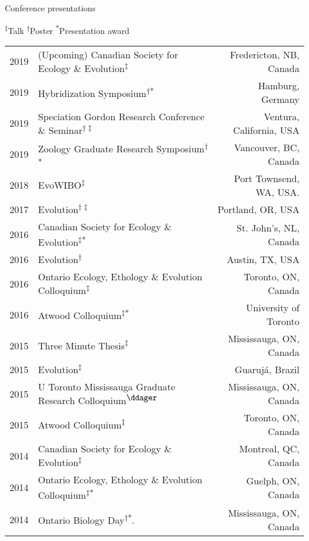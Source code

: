 \documentclass[11pt]{article}
\begin{document}
\vspace{0.5em}


\noindent
\begin{rSection}{Conference presentations} %


\textsuperscript{$\ddagger$}Talk
\textsuperscript{$\dag$}Poster
\textsuperscript{*}Presentation award

\vspace{0.5em}
\noindent
\begin{tabular}{llr}

2019 & (Upcoming) Canadian Society for Ecology \& Evolution\textsuperscript{$\ddagger$} & Fredericton, NB, Canada\\
2019 & Hybridization Symposium\textsuperscript{$\dag$*} & Hamburg, Germany\\
2019 & Speciation Gordon Research Conference \& Seminar\textsuperscript{$\dag\ddagger$} & Ventura, California, USA\\
2019 & Zoology Graduate Research Symposium\textsuperscript{$\dag$*} & Vancouver, BC, Canada\\
2018 & EvoWIBO\textsuperscript{$\ddagger$} & Port Townsend, WA, USA.\\
2017 & Evolution\textsuperscript{$\dag\ddagger$} & Portland, OR, USA\\
2016 & Canadian Society for Ecology \& Evolution\textsuperscript{$\ddagger$*} & St. John’s, NL, Canada\\
2016 & Evolution\textsuperscript{$\dag$} & Austin, TX, USA\\
2016 & Ontario Ecology, Ethology \& Evolution Colloquium\textsuperscript{$\ddagger$} & Toronto, ON, Canada\\
2016 & Atwood Colloquium\textsuperscript{$\ddagger$*} & University of Toronto\\
2015 & Three Minute Thesis\textsuperscript{$\ddagger$} & Mississauga, ON, Canada\\
2015 & Evolution\textsuperscript{$\ddagger$} & Guaruj\'a, Brazil\\
2015 & U Toronto Mississauga Graduate Research Colloquium\textsuperscript{$\ddager$} & Mississauga, ON, Canada\\
2015 & Atwood Colloquium\textsuperscript{$\ddagger$} & Toronto, ON, Canada\\
2014 & Canadian Society for Ecology \& Evolution\textsuperscript{$\ddagger$} & Montreal, QC, Canada\\
2014 & Ontario Ecology, Ethology \& Evolution Colloquium\textsuperscript{$\ddagger$*} & Guelph, ON, Canada\\
2014 & Ontario Biology Day\textsuperscript{$\dagger$*}. & Mississauga, ON, Canada\\
\end{tabular}

\end{rSection}
\vspace{1em}
\end{document}
